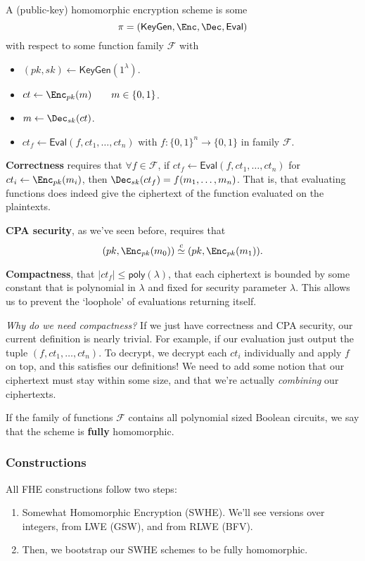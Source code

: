 \begin{definition}\label{def:fhe}
    A (public-key) homomorphic encryption scheme is some
    \[\pi = (\mathsf{KeyGen}, \Enc, \Dec, \mathsf{Eval})\]
    with respect to some function family $\mathcal{F}$ with
    \begin{itemize}
        \item $(pk, sk)\leftarrow \mathsf{KeyGen}(1^\lambda)$.
        \item $ct\leftarrow \Enc_{pk}(m)\qquad m\in \{0, 1\}$.
        \item $m\leftarrow \Dec_{sk}(ct)$.
        \item $ct_f\leftarrow \mathsf{Eval}(f, ct_1, \dots, ct_n)$ with $f : \{0, 1\}^n\to \{0, 1\}$ in family $\mathcal{F}$.
    \end{itemize}

    \textbf{Correctness} requires that $\forall f\in \mathcal{F}$, if $ct_f \leftarrow \mathsf{Eval}(f, ct_1, \dots, ct_n)$ for $ct_i\leftarrow \Enc_{pk}(m_i)$, then $\Dec_{sk}(ct_f) = f(m_1, \dots, m_n)$. That is, that evaluating functions does indeed give the ciphertext of the function evaluated on the plaintexts.

    \textbf{CPA security}, as we've seen before, requires that
    \[(pk, \Enc_{pk}(m_0))\overset{c}{\simeq}(pk, \Enc_{pk}(m_1)).\]
    
    \textbf{Compactness}, that $|ct_f| \leq \mathsf{poly}(\lambda)$, that each ciphertext is bounded by some constant that is polynomial in $\lambda$ and fixed for security parameter $\lambda$. This allows us to prevent the `loophole' of evaluations returning itself.
\end{definition}

\textit{Why do we need compactness?} If we just have correctness and CPA security, our current definition is nearly trivial. For example, if our evaluation just output the tuple $(f, ct_1, \dots, ct_n)$. To decrypt, we decrypt each $ct_i$ individually and apply $f$ on top, and this satisfies our definitions! We need to add some notion that our ciphertext must stay within some size, and that we're actually \emph{combining} our ciphertexts.

If the family of functions $\mathcal{F}$ contains all polynomial sized Boolean circuits, we say that the scheme is \textbf{fully} homomorphic.

\subsubsection{Constructions}
All FHE constructions follow two steps:
\begin{enumerate}
    \item Somewhat Homomorphic Encryption (SWHE). We'll see versions over integers, from LWE (GSW), and from RLWE (BFV).
    \item Then, we bootstrap our SWHE schemes to be fully homomorphic.
\end{enumerate}

